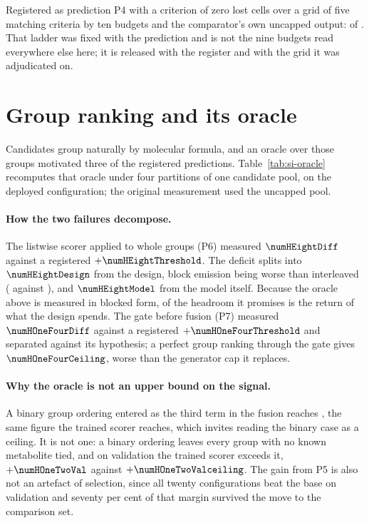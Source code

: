 \documentclass[journal=jcisd8,manuscript=suppinfo,layout=onecolumn]{achemso}
\begin{document}
Registered as prediction P4 with a criterion of zero lost cells
over a grid of five matching criteria by ten budgets and the comparator's own uncapped output:
\numHOneOneLost{} of \numHOneOneCells{}. That ladder was fixed with the prediction and is not the
nine budgets read everywhere else here; it is released with the register and with the grid it was
adjudicated on.
\section{Group ranking and its oracle}
\label{sec:si-oracle}



Candidates group naturally by molecular formula, and an oracle over those groups motivated three
of the registered predictions. Table~\ref{tab:si-oracle} recomputes that oracle under four
partitions of one candidate pool, on the deployed configuration; the original measurement used
the uncapped pool.

\paragraph{How the two failures decompose.} The listwise scorer applied to whole groups (P6)
measured $\numHEightDiff$ against a registered $+\numHEightThreshold$. The deficit splits into
$\numHEightDesign$ from the design, block emission being worse than interleaved
(\numHEightBlocked{} against \numHEightInterleaved{}), and $\numHEightModel$ from the model
itself. Because the oracle above is measured in blocked form,
\numHEightDesignShare{} of the headroom it promises is the return of what the design spends.
The gate before fusion (P7) measured $\numHOneFourDiff$ against a registered
$+\numHOneFourThreshold$ and separated against its hypothesis; a perfect group ranking through
the gate gives $\numHOneFourCeiling$, worse than the generator cap it replaces.

\paragraph{Why the oracle is not an upper bound on the signal.} A binary group ordering entered
as the third term in the fusion reaches \numHOneTwoCeilingrecall{}, the same figure the trained
scorer reaches, which invites reading the binary case as a ceiling. It is not one: a binary ordering leaves every group with no known metabolite tied, and on validation the trained scorer exceeds it,
$+\numHOneTwoVal$ against $+\numHOneTwoValceiling$. The gain from P5 is also not an artefact of
selection, since all twenty configurations beat the base on validation and seventy per cent of
that margin survived the move to the comparison set.
\end{document}
